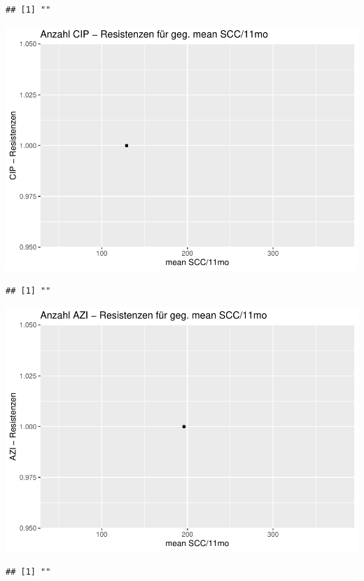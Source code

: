\documentclass[
]{article}
\begin{document}
\begin{verbatim}
## [1] ""
\end{verbatim}

\includegraphics{NResistenzen_files/figure-latex/unnamed-chunk-6-12.pdf}

\begin{verbatim}
## [1] ""
\end{verbatim}

\includegraphics{NResistenzen_files/figure-latex/unnamed-chunk-6-13.pdf}

\begin{verbatim}
## [1] ""
\end{verbatim}
\end{document}
